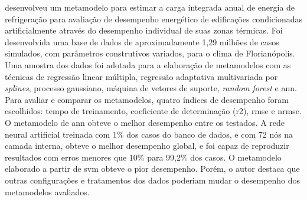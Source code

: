  desenvolveu um metamodelo para estimar a carga integrada anual de energia de refrigeração para avaliação de desempenho energético de edificações condicionadas artificialmente através do desempenho individual de suas zonas térmicas. Foi desenvolvida uma base de dados de aproximadamente 1,29 milhões de casos simulados, com parâmetros construtivos variados, para o clima de Florianópolis. Uma amostra dos dados foi adotada para a elaboração de metamodelos com as técnicas de regressão linear múltipla, regressão adaptativa multivariada por \textit{splines}, processo gaussiano, máquina de vetores de suporte, \textit{random forest} e \acrlong{ann}. Para avaliar e comparar os metamodelos, quatro índices de desempenho foram escolhidos: tempo de treinamento, coeficiente de determinação (\acrshort{r2}), \acrshort{rmse} e \acrfull{nrmse}. O metamodelo de \acrshort{ann} obteve o melhor desempenho entre os testados. A rede neural artificial treinada com 1\% dos casos do banco de dados, e com 72 nós na camada interna, obteve o melhor desempenho global, e foi capaz de reproduzir resultados com erros menores que 10\% para 99,2\% dos casos. O metamodelo elaborado a partir de \acrshort{svm} obteve o pior desempenho. Porém, o autor destaca que outras configurações e tratamentos dos dados poderiam mudar o desempenho dos metamodelos avaliados.